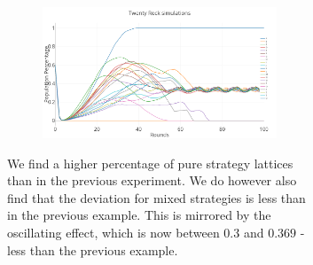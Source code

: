 \documentclass[a4paper, 11pt]{article}
\begin{document}
\begin{figure}[H]
\begin{subfigure}{.65\textwidth}
	\begin{subfigure}{1\textwidth}
		\includegraphics[width=1\linewidth]{50x50_60RockDist_IndividualRock}
	\end{subfigure}		
	
\end{subfigure}%
\begin{subfigure}{.35\textwidth}
	
	We find a higher percentage of pure strategy lattices than in the previous experiment. We do however also find that the deviation for mixed strategies is less than in the previous example. This is mirrored by the oscillating effect, which is now between $0.3$ and $0.369$ - less than the previous example.
\end{subfigure}

\end{figure}
\end{document}
